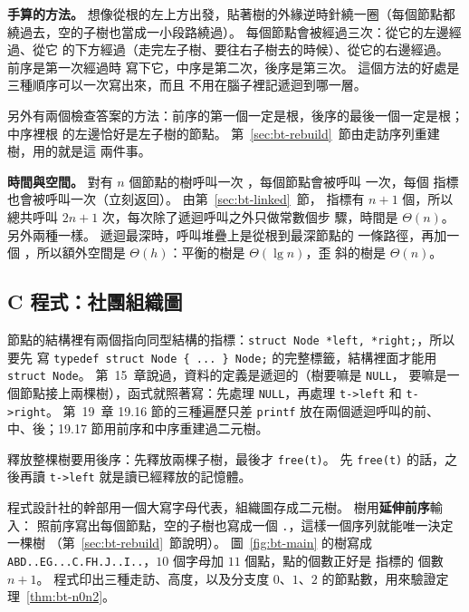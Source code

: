\textbf{手算的方法。} 想像從根的左上方出發，貼著樹的外緣逆時針繞一圈（每個節點都
繞過去，空的子樹也當成一小段路繞過）。 每個節點會被經過三次：從它的左邊經過、從它
的下方經過（走完左子樹、要往右子樹去的時候）、從它的右邊經過。 前序是第一次經過時
寫下它，中序是第二次，後序是第三次。 這個方法的好處是三種順序可以一次寫出來，而且
不用在腦子裡記遞迴到哪一層。

另外有兩個檢查答案的方法：前序的第一個一定是根，後序的最後一個一定是根；中序裡根
的左邊恰好是左子樹的節點。 第~\ref{sec:bt-rebuild}~節由走訪序列重建樹，用的就是這
兩件事。

\textbf{時間與空間。} 對有 $n$ 個節點的樹呼叫一次 ，每個節點會被呼叫
一次，每個 \NIL 指標也會被呼叫一次（立刻返回）。 由第~\ref{sec:bt-linked}~節，
\NIL 指標有 $n + 1$ 個，所以總共呼叫 $2n + 1$ 次，每次除了遞迴呼叫之外只做常數個步
驟，時間是 $\Theta(n)$。 另外兩種一樣。 遞迴最深時，呼叫堆疊上是從根到最深節點的
一條路徑，再加一個 \NIL，所以額外空間是 $\Theta(h)$：平衡的樹是 $\Theta(\lg n)$，歪
斜的樹是 $\Theta(n)$。

\subsection{C 程式：社團組織圖}

\begin{cbookrecap}[第~14~章 14.5 節、第~15~章 15.10 節、第~19~章 19.14--19.17 節]
節點的結構裡有兩個指向同型結構的指標：\texttt{struct Node *left, *right;}，所以要先
寫 \texttt{typedef struct Node \{ ... \} Node;} 的完整標籤，結構裡面才能用
\texttt{struct Node}。 第~15~章說過，資料的定義是遞迴的（樹要嘛是 \texttt{NULL}，
要嘛是一個節點接上兩棵樹），函式就照著寫：先處理 \texttt{NULL}，再處理
\texttt{t->left} 和 \texttt{t->right}。 第~19~章 19.16 節的三種遍歷只差
\texttt{printf} 放在兩個遞迴呼叫的前、中、後；19.17 節用前序和中序重建過二元樹。

釋放整棵樹要用後序：先釋放兩棵子樹，最後才 \texttt{free(t)}。 先 \texttt{free(t)}
的話，之後再讀 \texttt{t->left} 就是讀已經釋放的記憶體。
\end{cbookrecap}

程式設計社的幹部用一個大寫字母代表，組織圖存成二元樹。 樹用\textbf{延伸前序}輸入：
照前序寫出每個節點，空的子樹也寫成一個 \texttt{.}，這樣一個序列就能唯一決定一棵樹
（第~\ref{sec:bt-rebuild}~節說明）。 圖~\ref{fig:bt-main} 的樹寫成
\texttt{ABD..EG...C.FH.J..I..}，$10$ 個字母加 $11$ 個點，點的個數正好是 \NIL 指標的
個數 $n + 1$。 程式印出三種走訪、高度，以及分支度 $0$、$1$、$2$ 的節點數，用來驗證定
理~\ref{thm:bt-n0n2}。


